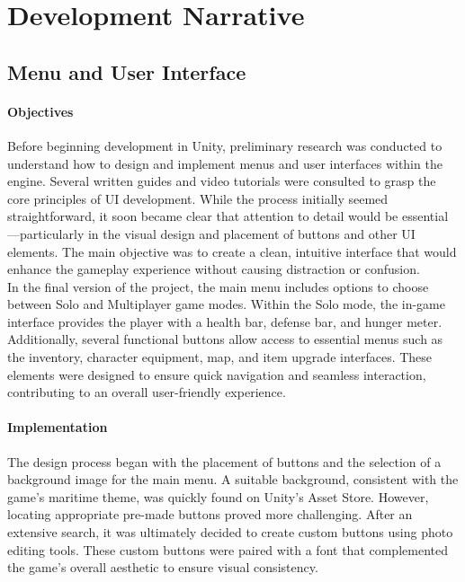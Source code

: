 \documentclass{article}
\begin{document}
\section{Development Narrative}





\subsection{Menu and User Interface}
\paragraph{Objectives}\hfill

Before beginning development in Unity, preliminary research was conducted to understand how to design and implement menus and user interfaces within the engine. Several written guides and video tutorials were consulted to grasp the core principles of UI development. While the process initially seemed straightforward, it soon became clear that attention to detail would be essential—particularly in the visual design and placement of buttons and other UI elements. The main objective was to create a clean, intuitive interface that would enhance the gameplay experience without causing distraction or confusion.\\

In the final version of the project, the main menu includes options to choose between Solo and Multiplayer game modes. Within the Solo mode, the in-game interface provides the player with a health bar, defense bar, and hunger meter. Additionally, several functional buttons allow access to essential menus such as the inventory, character equipment, map, and item upgrade interfaces. These elements were designed to ensure quick navigation and seamless interaction, contributing to an overall user-friendly experience.\\

\paragraph{Implementation}\hfill

The design process began with the placement of buttons and the selection of a background image for the main menu. A suitable background, consistent with the game's maritime theme, was quickly found on Unity's Asset Store. However, locating appropriate pre-made buttons proved more challenging. After an extensive search, it was ultimately decided to create custom buttons using photo editing tools. These custom buttons were paired with a font that complemented the game's overall aesthetic to ensure visual consistency.\\
\end{document}

